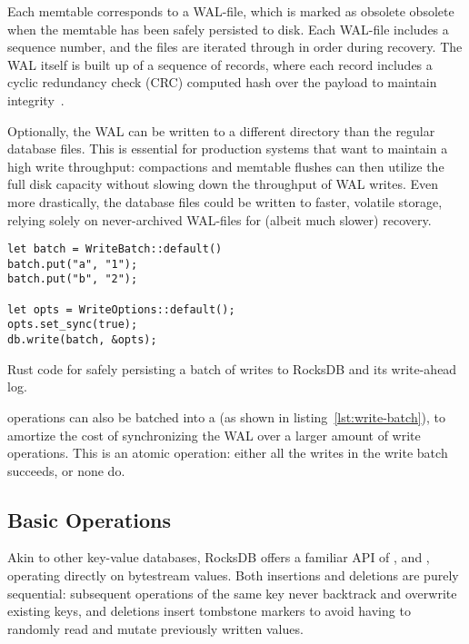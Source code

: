 Each memtable corresponds to a WAL-file, which is marked as obsolete obsolete
when the memtable has been safely persisted to disk. Each WAL-file includes a
sequence number, and the files are iterated through in order during recovery.
The WAL itself is built up of a sequence of records, where each record includes
a cyclic redundancy check (CRC) computed hash over the payload to maintain
integrity~\cite{rocksdb-wal}.

Optionally, the WAL can be written to a different directory than the regular
database files. This is essential for production systems that want to maintain a
high write throughput: compactions and memtable flushes can then utilize the
full disk capacity without slowing down the throughput of WAL writes. Even more
drastically, the database files could be written to faster, volatile storage,
relying solely on never-archived WAL-files for (albeit much slower) recovery.

\begin{listing}[H]\label{lst:write-batch}
  \begin{verbatim}
let batch = WriteBatch::default()
batch.put("a", "1");
batch.put("b", "2");

let opts = WriteOptions::default();
opts.set_sync(true);
db.write(batch, &opts);
  \end{verbatim}

  \caption{Rust code for safely persisting a batch of writes to RocksDB and its
  write-ahead log.}
\end{listing}

 operations can also be batched into a  (as shown in
listing~\ref{lst:write-batch}), to amortize the cost of synchronizing the WAL
over a larger amount of write operations. This is an atomic operation: either
all the writes in the write batch succeeds, or none do.

\subsection{Basic Operations}
Akin to other key-value databases, RocksDB offers a familiar API of
,  and , operating
directly on bytestream values. Both insertions and deletions are purely
sequential: subsequent  operations of the same key never backtrack and
overwrite existing keys, and deletions insert tombstone markers to avoid having
to randomly read and mutate previously written values.

